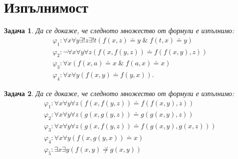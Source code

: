 \documentclass[12pt]{article}
\newcommand{\logand}{\; \& \;}
\newtheorem{problem}{Задача}[section]
\theoremstyle{definition}
\begin{document}
\newpage

\section{Изпълнимост}

\begin{problem}
Да се докаже, че следното множество от формули е изпълнимо:
\begin{align*}
	 & \varphi_1 : \forall x \forall y \exists ! z \exists ! t (f(x, z) \doteq y \logand f(t, x) \doteq y) \\
	 & \varphi_2 : \neg \forall x \forall y \forall z (f(x, f(y, z)) \doteq f(f(x, y), z))                 \\
	 & \varphi_3 : \forall x (f(x, a) \doteq x \logand f(a, x) \doteq x)                                   \\
	 & \varphi_4 : \forall x \forall y (f(x, y) \doteq f(y, x)).
\end{align*}
\end{problem}

\begin{problem}
Да се докаже, че следното множество от формули е изпълнимо:
\begin{align*}
	 & \varphi_1 : \forall x \forall y \forall z (f(x, f(y, z)) \doteq f(f(x, y), z))       \\
	 & \varphi_2 : \forall x \forall y \forall z (g(x, g(y, z)) \doteq g(g(x, y), z))       \\
	 & \varphi_3 : \forall x \forall y \forall z (g(x, f(y, z)) \doteq f(g(x, y), g(x, z))) \\
	 & \varphi_4 : \forall x \forall y (f(x, g(y, x)) \doteq x)                             \\
	 & \varphi_5 : \exists x \exists y (f(x, y) \not \doteq g(x, y))                        \\
\end{align*}
\end{problem}
\end{document}
